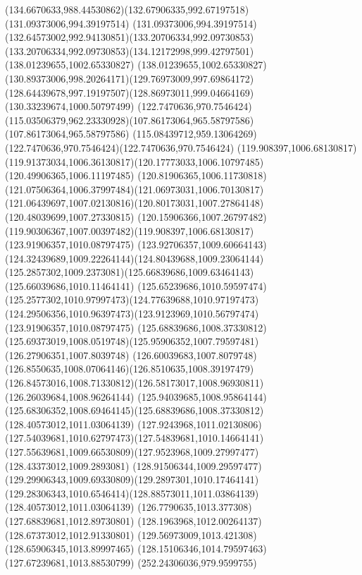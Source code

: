 {{\curveto(134.6670633,988.44530862)(132.67906335,992.67197518)(131.09373006,994.39197514)
\curveto(131.09373006,994.39197514)(132.64573002,992.94130851)(133.20706334,992.09730853)
\curveto(133.20706334,992.09730853)(134.12172998,999.42797501)(138.01239655,1002.65330827)
\curveto(138.01239655,1002.65330827)(130.89373006,998.20264171)(129.76973009,997.69864172)
\curveto(128.64439678,997.19197507)(128.86973011,999.04664169)(130.33239674,1000.50797499)
\moveto(122.7470636,970.7546424)
\curveto(115.03506379,962.23330928)(107.86173064,965.58797586)(107.86173064,965.58797586)
\curveto(115.08439712,959.13064269)(122.7470636,970.7546424)(122.7470636,970.7546424)
\moveto(119.908397,1006.68130817)
\curveto(119.91373034,1006.36130817)(120.17773033,1006.10797485)(120.49906365,1006.11197485)
\curveto(120.81906365,1006.11730818)(121.07506364,1006.37997484)(121.06973031,1006.70130817)
\curveto(121.06439697,1007.02130816)(120.80173031,1007.27864148)(120.48039699,1007.27330815)
\curveto(120.15906366,1007.26797482)(119.90306367,1007.00397482)(119.908397,1006.68130817)
\moveto(123.91906357,1010.08797475)
\curveto(123.92706357,1009.60664143)(124.32439689,1009.22264144)(124.80439688,1009.23064144)
\curveto(125.2857302,1009.2373081)(125.66839686,1009.63464143)(125.66039686,1010.11464141)
\curveto(125.65239686,1010.59597474)(125.2577302,1010.97997473)(124.77639688,1010.97197473)
\curveto(124.29506356,1010.96397473)(123.9123969,1010.56797474)(123.91906357,1010.08797475)
\moveto(125.68839686,1008.37330812)
\curveto(125.69373019,1008.0519748)(125.95906352,1007.79597481)(126.27906351,1007.8039748)
\curveto(126.60039683,1007.8079748)(126.8550635,1008.07064146)(126.8510635,1008.39197479)
\curveto(126.84573016,1008.71330812)(126.58173017,1008.96930811)(126.26039684,1008.96264144)
\curveto(125.94039685,1008.95864144)(125.68306352,1008.69464145)(125.68839686,1008.37330812)
\moveto(128.40573012,1011.03064139)
\curveto(127.9243968,1011.02130806)(127.54039681,1010.62797473)(127.54839681,1010.14664141)
\curveto(127.55639681,1009.66530809)(127.9523968,1009.27997477)(128.43373012,1009.2893081)
\curveto(128.91506344,1009.29597477)(129.29906343,1009.69330809)(129.2897301,1010.17464141)
\curveto(129.28306343,1010.6546414)(128.88573011,1011.03864139)(128.40573012,1011.03064139)
\moveto(126.7790635,1013.377308)
\lineto(127.68839681,1012.89730801)
\lineto(128.1963968,1012.00264137)
\lineto(128.67373012,1012.91330801)
\lineto(129.56973009,1013.421308)
\lineto(128.65906345,1013.89997465)
\lineto(128.15106346,1014.79597463)
\lineto(127.67239681,1013.88530799)
\closepath
\moveto(252.24306036,979.9599755)
}}
